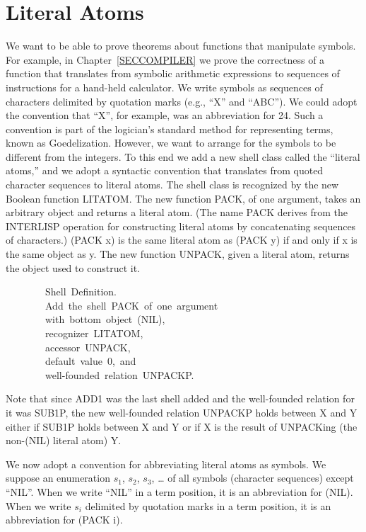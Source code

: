 \documentclass[10pt]{book}
\newenvironment{pubasis}{\begin{flushleft}}{\end{flushleft}}
\begin{document}
\section{Literal Atoms}
We want to be able to prove theorems about functions that
manipulate symbols.  For example, in Chapter~\ref{SECCOMPILER}
we prove the correctness of a function that
translates from symbolic arithmetic expressions to sequences of instructions
for a hand-held calculator.  We write symbols as sequences of characters
delimited by quotation marks  (e.g., ``X'' and ``ABC'').  We could
adopt the convention that ``X'', for example, was an abbreviation for 24.  Such
a convention is part of the logician's standard method for
representing terms, known as Goedelization.
However,
we want to arrange for the symbols to be different from the
integers.  To this end
we add a new shell class called the ``literal atoms,'' and we adopt
a syntactic convention that translates from quoted character sequences
to literal atoms.
The shell class is  recognized by the
new Boolean function LITATOM.  The new function PACK, of one argument, 
takes an arbitrary object and returns a literal atom.  (The name PACK
derives from the INTERLISP operation for constructing literal atoms by
concatenating sequences of characters.)  (PACK x) is the same
literal atom as (PACK y) if and only if x
is the same object as y.  The new function UNPACK, given a literal atom, returns the object
used to construct it.

\hrulefill 

\begin{pubasis}
~~~~~~~~Shell~Definition.\\
~~~~~~~~Add~the~shell~PACK~of~one~argument\\
~~~~~~~~with~bottom~object~(NIL),\\
~~~~~~~~recognizer~LITATOM,\\
~~~~~~~~accessor~UNPACK,\\
~~~~~~~~default~value~0,~and\\
~~~~~~~~well-founded~relation~UNPACKP.\\
\end{pubasis}

\hrulefill 

Note that since ADD1 was the last shell added
and the well-founded relation for it was SUB1P, the new well-founded relation
UNPACKP holds between X and Y  either if SUB1P holds between X and Y or
if X is the result of UNPACKing (the non-(NIL) literal atom) Y.

We now adopt a convention for abbreviating literal atoms as symbols.
We suppose an enumeration $s_{1}$, $s_{2}$, $s_{3}$, \ldots{}
of all symbols (character sequences) except ``NIL''.  When we write
``NIL'' in a term position, it is an abbreviation for (NIL).  When
we write $s_{i}$ delimited by quotation marks in a term position,
it is an abbreviation for (PACK i).
\end{document}
